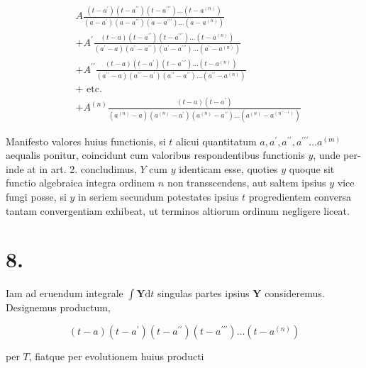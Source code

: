 \documentclass[10pt]{article}
\begin{document}
\[
\begin{aligned}
& A \frac{\left(t-a^{\prime}\right)\left(t-a^{\prime \prime}\right)\left(t-a^{\prime \prime \prime}\right) \ldots\left(t-a^{(n)}\right)}{\left(a-a^{\prime}\right)\left(a-a^{\prime \prime}\right)\left(a-a^{\prime \prime \prime}\right) \ldots\left(a-a^{(n)}\right)} \\
&+A^{\prime} \frac{(t-a)\left(t-a^{\prime \prime}\right)\left(t-a^{\prime \prime \prime}\right) \ldots\left(t-a^{(n)}\right)}{\left(a^{\prime}-a\right)\left(a^{\prime}-a^{\prime \prime}\right)\left(a^{\prime}-a^{\prime \prime \prime}\right) \ldots\left(a^{\prime}-a^{(n)}\right)} \\
&+A^{\prime \prime} \frac{(t-a)\left(t-a^{\prime}\right)\left(t-a^{\prime \prime \prime}\right) \ldots\left(t-a^{(n)}\right)}{\left(a^{\prime \prime}-a\right)\left(a^{\prime \prime}-a^{\prime}\right)\left(a^{\prime \prime}-a^{\prime \prime}\right) \ldots\left(a^{\prime \prime}-a^{(n)}\right)} \\
&+ \text { etc. } \\
&+A^{(n)} \frac{(t-a)\left(t-a^{\prime}\right)}{\left(a^{(n)}-a\right)\left(a^{(n)}-a^{\prime}\right)\left(a^{(n)}-a^{\prime \prime}\right) \ldots\left(a^{(n)}-a^{\left(n^{\prime \prime-1}\right)}\right)}
\end{aligned}
\]

Manifesto valores huius functionis, si \(t\) alicui quantitatum \(a, a^{\prime}, a^{\prime \prime}, a^{\prime \prime \prime} \ldots a^{(m)}\) aequalis ponitur, coincidunt cum valoribus respondentibus functionis \(y\), unde per-
inde at in art. 2. concludimus, \(Y\) cum \(y\) identicam esse, quoties \(y\) quoque sit functio algebraica integra ordinem \(n\) non transscendens, aut saltem ipsius \(y\) vice fungi posse, si \(y\) in seriem secundum potestates ipsius \(t\) progredientem conversa tantam convergentiam exhibeat, ut terminos altiorum ordinum negligere liceat.

\section*{8.}
Iam ad eruendum integrale \(\int \boldsymbol{Y} \mathrm{d} t\) singulas partes ipsius \(\boldsymbol{Y}\) consideremus. Designemus productum,

\[
(t-a)\left(t-a^{\prime}\right)\left(t-a^{\prime \prime}\right)\left(t-a^{\prime \prime \prime}\right) \ldots\left(t-a^{(n)}\right)
\]

per \(T\), fiatque per evolutionem huius producti
\end{document}
